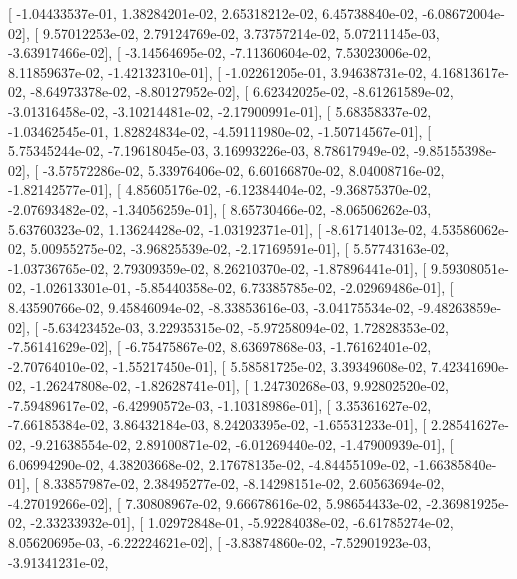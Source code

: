 \documentclass{article}
\begin{document}
       [ -1.04433537e-01,   1.38284201e-02,   2.65318212e-02,
          6.45738840e-02,  -6.08672004e-02],
       [  9.57012253e-02,   2.79124769e-02,   3.73757214e-02,
          5.07211145e-03,  -3.63917466e-02],
       [ -3.14564695e-02,  -7.11360604e-02,   7.53023006e-02,
          8.11859637e-02,  -1.42132310e-01],
       [ -1.02261205e-01,   3.94638731e-02,   4.16813617e-02,
         -8.64973378e-02,  -8.80127952e-02],
       [  6.62342025e-02,  -8.61261589e-02,  -3.01316458e-02,
         -3.10214481e-02,  -2.17900991e-01],
       [  5.68358337e-02,  -1.03462545e-01,   1.82824834e-02,
         -4.59111980e-02,  -1.50714567e-01],
       [  5.75345244e-02,  -7.19618045e-03,   3.16993226e-03,
          8.78617949e-02,  -9.85155398e-02],
       [ -3.57572286e-02,   5.33976406e-02,   6.60166870e-02,
          8.04008716e-02,  -1.82142577e-01],
       [  4.85605176e-02,  -6.12384404e-02,  -9.36875370e-02,
         -2.07693482e-02,  -1.34056259e-01],
       [  8.65730466e-02,  -8.06506262e-03,   5.63760323e-02,
          1.13624428e-02,  -1.03192371e-01],
       [ -8.61714013e-02,   4.53586062e-02,   5.00955275e-02,
         -3.96825539e-02,  -2.17169591e-01],
       [  5.57743163e-02,  -1.03736765e-02,   2.79309359e-02,
          8.26210370e-02,  -1.87896441e-01],
       [  9.59308051e-02,  -1.02613301e-01,  -5.85440358e-02,
          6.73385785e-02,  -2.02969486e-01],
       [  8.43590766e-02,   9.45846094e-02,  -8.33853616e-03,
         -3.04175534e-02,  -9.48263859e-02],
       [ -5.63423452e-03,   3.22935315e-02,  -5.97258094e-02,
          1.72828353e-02,  -7.56141629e-02],
       [ -6.75475867e-02,   8.63697868e-03,  -1.76162401e-02,
         -2.70764010e-02,  -1.55217450e-01],
       [  5.58581725e-02,   3.39349608e-02,   7.42341690e-02,
         -1.26247808e-02,  -1.82628741e-01],
       [  1.24730268e-03,   9.92802520e-02,  -7.59489617e-02,
         -6.42990572e-03,  -1.10318986e-01],
       [  3.35361627e-02,  -7.66185384e-02,   3.86432184e-03,
          8.24203395e-02,  -1.65531233e-01],
       [  2.28541627e-02,  -9.21638554e-02,   2.89100871e-02,
         -6.01269440e-02,  -1.47900939e-01],
       [  6.06994290e-02,   4.38203668e-02,   2.17678135e-02,
         -4.84455109e-02,  -1.66385840e-01],
       [  8.33857987e-02,   2.38495277e-02,  -8.14298151e-02,
          2.60563694e-02,  -4.27019266e-02],
       [  7.30808967e-02,   9.66678616e-02,   5.98654433e-02,
         -2.36981925e-02,  -2.33233932e-01],
       [  1.02972848e-01,  -5.92284038e-02,  -6.61785274e-02,
          8.05620695e-03,  -6.22224621e-02],
       [ -3.83874860e-02,  -7.52901923e-03,  -3.91341231e-02,
\end{document}
